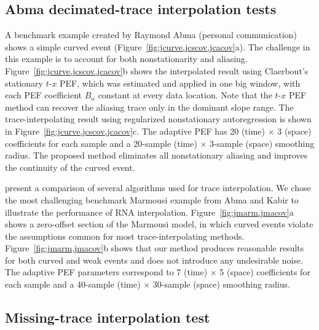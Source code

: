 \subsection{Abma decimated-trace interpolation tests}

A benchmark example created by Raymond Abma (personal communication)
shows a simple curved event
(Figure~\ref{fig:jcurve,jcscov,jcacov}a). The challenge in this
example is to account for both nonstationarity and
aliasing. Figure~\ref{fig:jcurve,jcscov,jcacov}b shows the
interpolated result using Claerbout's stationary $t$-$x$ PEF, which
was estimated and applied in one big window, with each PEF coefficient
$B_n$ constant at every data location. Note that the $t$-$x$ PEF
method can recover the aliasing trace only in the dominant slope
range. The trace-interpolating result using regularized nonstationary
autoregression is shown in Figure~\ref{fig:jcurve,jcscov,jcacov}c. The
adaptive PEF has 20 (time) $\times$ 3 (space) coefficients for each
sample and a 20-sample (time) $\times$ 3-sample (space) smoothing
radius. The proposed method eliminates all nonstationary aliasing and
improves the continuity of the curved event.

\cite{Abma05} present a comparison of several algorithms used for
trace interpolation. We chose the most challenging benchmark Marmousi
example from Abma and Kabir to illustrate the performance of RNA
interpolation. Figure~\ref{fig:jmarm,jmacov}a shows a zero-offset
section of the Marmousi model, in which curved events violate the
assumptions common for most trace-interpolating
methods. Figure~\ref{fig:jmarm,jmacov}b shows that our method produces
reasonable results for both curved and weak events and does not
introduce any undesirable noise. The adaptive PEF parameters
correspond to 7 (time) $\times$ 5 (space) coefficients for each sample
and a 40-sample (time) $\times$ 30-sample (space) smoothing radius.



\subsection{Missing-trace interpolation test}

